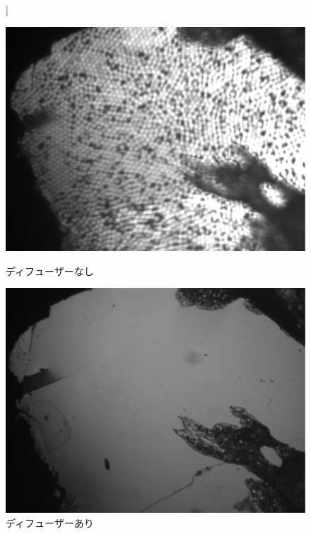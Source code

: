 \begin{figure}[htb]]
 \begin{minipage}{0.5\hsize}
  \begin{center}
   \includegraphics[width=\hsize]{optics_microscopy/without_diffuser.eps}
  \end{center}
  \caption{ディフューザーなし}
  \label{fig:without_diffuser}
 \end{minipage}
 \begin{minipage}{0.5\hsize}
  \begin{center}
   \includegraphics[width=\hsize]{optics_microscopy/with_diffuser.eps}
  \end{center}
  \caption{ディフューザーあり}
  \label{fig:with_diffuser}
 \end{minipage}
\end{figure}

